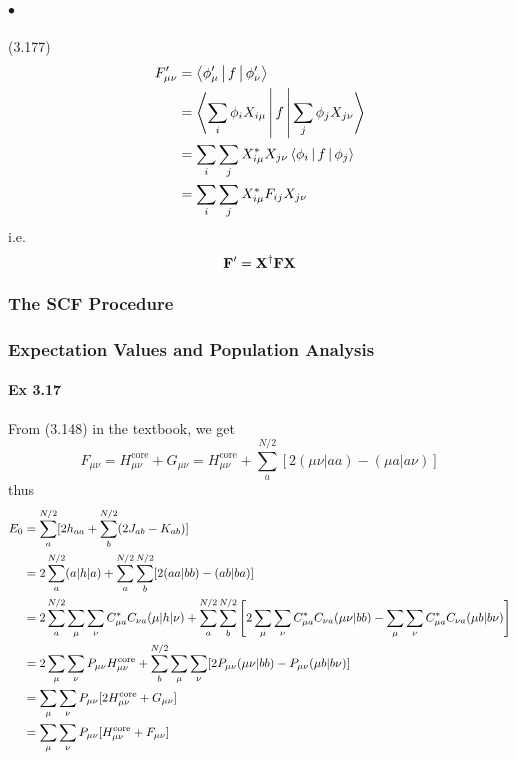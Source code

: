 \documentclass[a4paper]{article}
\DeclareMathOperator{\core}{\mathrm{core}}
\newcommand{\ex}[1]{\paragraph{Ex #1}}
\newcommand{\subex}[1]{\subparagraph{#1}}
\numberwithin{equation}{subsection}
\begin{document}
\subex{$ \bullet $} (3.177)
\begin{align}
F'_{\mu\nu} &= \Braket{\phi'_\mu | f | \phi'_\nu} \notag\\
&= \Braket{\sum_i \phi_i X_{i\mu} | f | \sum_j \phi_j X_{j\nu}} \notag\\
&= \sum_i\sum_j X^*_{i\mu} X_{j\nu} \Braket{\phi_i | f | \phi_j} \notag\\
&= \sum_i\sum_j X^*_{i\mu} F_{ij} X_{j\nu} 
\end{align}
i.e.
\begin{equation}\label{key}
\vb{F}' = \vb{X}^\dagger \vb{F} \vb{X}
\end{equation}

\subsubsection{The SCF Procedure}

\subsubsection{Expectation Values and Population Analysis}
\ex{3.17}
From (3.148) in the textbook, we get
\begin{equation}\label{key}
F_{\mu\nu} = H_{\mu\nu}^{\core} + G_{\mu\nu} = H_{\mu\nu}^{\core} + \sum_a^{N/2}[ 2(\mu\nu|aa) - (\mu a| a\nu)]
\end{equation}
thus
\begin{align}
E_0 &= \sum_a^{N/2} [2 h_{aa} + \sum_b^{N/2} (2 J_{ab} - K_{ab})] \notag\\
&= 2 \sum_a^{N/2} (a|h|a) + \sum_a^{N/2}\sum_b^{N/2} [2 (aa|bb) - (ab|ba)] \notag\\
&= 2 \sum_a^{N/2} \sum_\mu\sum_\nu C_{\mu a}^* C_{\nu a} (\mu| h |\nu) 
+ \sum_a^{N/2}\sum_b^{N/2} \qty[2\sum_\mu\sum_\nu C_{\mu a}^* C_{\nu a} (\mu\nu|bb) - \sum_\mu\sum_\nu C_{\mu a}^* C_{\nu a} (\mu b| b\nu)] \notag\\
&= 2\sum_\mu\sum_\nu P_{\mu\nu} H_{\mu\nu}^{\core} + \sum_b^{N/2}\sum_\mu\sum_\nu[2 P_{\mu\nu}(\mu\nu|bb) - P_{\mu\nu}(\mu b|b\nu)] \notag\\
&= \sum_\mu\sum_\nu P_{\mu\nu} [2 H_{\mu\nu}^{\core} + G_{\mu\nu}] \notag\\
&= \sum_\mu\sum_\nu P_{\mu\nu} [H_{\mu\nu}^{\core} + F_{\mu\nu}] \notag\\
\end{align}
\end{document}
